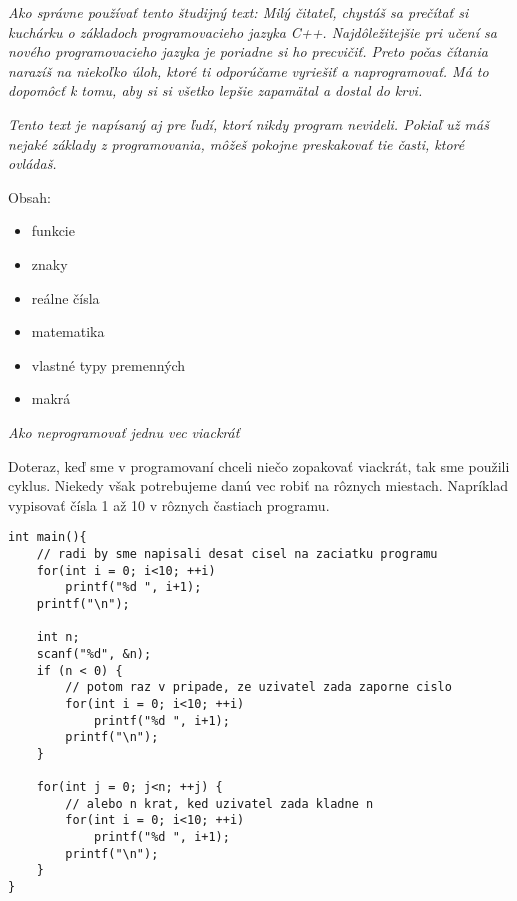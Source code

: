 




\textit{Ako správne používať tento študijný text: Milý čitateľ, chystáš sa
prečítať si kuchárku o základoch programovacieho jazyka C++. Najdôležitejšie
pri učení sa nového programovacieho jazyka je poriadne si ho precvičiť. Preto
počas čítania narazíš na niekoľko úloh, ktoré ti odporúčame vyriešiť a
naprogramovať.  Má to dopomôcť k tomu, aby si si všetko lepšie zapamätal a dostal
do krvi.}

\textit{Tento text je napísaný aj pre ľudí, ktorí nikdy program nevideli. Pokiaľ
už máš nejaké základy z programovania, môžeš pokojne preskakovať tie časti,
ktoré ovládaš.}

Obsah:
\begin{itemize}
    \item funkcie
    \item znaky
    \item reálne čísla
    \item matematika
    \item vlastné typy premenných
    \item makrá
\end{itemize}

\medskip


\textit{Ako neprogramovať jednu vec viackráť}

Doteraz, keď sme v programovaní chceli niečo zopakovať viackrát, tak
sme použili cyklus. Niekedy však potrebujeme danú vec robiť na rôznych miestach.
Napríklad vypisovať čísla 1 až 10 v rôznych častiach programu.

\begin{lstlisting}
int main(){
    // radi by sme napisali desat cisel na zaciatku programu
    for(int i = 0; i<10; ++i)
        printf("%d ", i+1);
    printf("\n");

    int n;
    scanf("%d", &n);
    if (n < 0) {
        // potom raz v pripade, ze uzivatel zada zaporne cislo
        for(int i = 0; i<10; ++i)
            printf("%d ", i+1);
        printf("\n");
    }

    for(int j = 0; j<n; ++j) {
        // alebo n krat, ked uzivatel zada kladne n
        for(int i = 0; i<10; ++i)
            printf("%d ", i+1);
        printf("\n");        
    }
}
\end{lstlisting}

